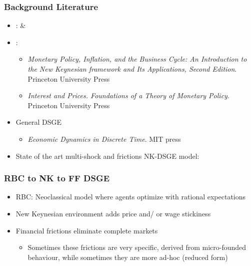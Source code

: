 \documentclass[xcolor=dvipsnames,handout,aspectratio=169]{beamer}
\let\oldcite=\cite
\renewcommand\cite[1]{\hypersetup{linkcolor=blue} \hyperlink{#1}{\oldcite{#1}}}
\begin{document}
\begin{frame}[c]\frametitle {\textbf{Background Literature}} \label{conclusion}
\begin{itemize}
    \setlength\itemsep{1.5em}
\item {\color{black}{Seminal RBC models}}:  \cite{kydland1982time} \& \cite{long1983real}
\item {\color{black}{New Keynesian main textbooks}}:
\begin{itemize}
     \item   \cite{gali2015monetary} \textit{Monetary Policy, Inflation, and the Business Cycle: An Introduction to the New Keynesian
framework and Its Applications, Second Edition}. Princeton University Press
\item \cite{woodford2011interest}
\textit{Interest and Prices. Foundations of a Theory of Monetary Policy}. Princeton University Press
\end{itemize} 
\item General DSGE
\begin{itemize}
    \item \cite{miao2020economic} \textit{Economic Dynamics in Discrete Time}. MIT press
\end{itemize}
\item State of the art multi-shock and frictions NK-DSGE model: \cite{smets2007shocks} 
\end{itemize}
\end{frame}

\begin{frame}[c]\frametitle {\textbf{RBC to NK to FF DSGE}} \label{conclusion}
\begin{itemize}
   \item RBC: Neoclassical model where agents optimize with rational expectations
   \item New Keynesian environment adds price and/ or wage stickiness
   \item Financial frictions eliminate complete markets
   \begin{itemize}
       \item Sometimes these frictions are very specific, derived from micro-founded behaviour, while sometimes they are more ad-hoc (reduced form)
   \end{itemize}
\end{itemize}
\end{frame}
\end{document}
